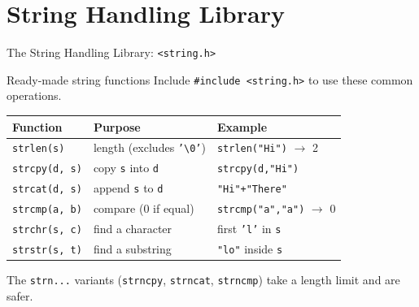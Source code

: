 \documentclass[aspectratio=169]{beamer}
\begin{document}
	\section{String Handling Library}
	\begin{frame}{The String Handling Library: \texttt{<string.h>}}
		\begin{block}{Ready-made string functions}
			Include \texttt{\#include <string.h>} to use these common operations.
		\end{block}
		\renewcommand{\arraystretch}{1.3}
		\centering
		\begin{tabular}{@{}llp{5.7cm}@{}}
			\toprule
			\textbf{Function} & \textbf{Purpose} & \textbf{Example} \\
			\midrule
			\texttt{strlen(s)}      & length (excludes \texttt{'\textbackslash 0'}) & \texttt{strlen("Hi")} $\rightarrow$ 2 \\
			\texttt{strcpy(d, s)}   & copy \texttt{s} into \texttt{d}   & \texttt{strcpy(d,"Hi")} \\
			\texttt{strcat(d, s)}   & append \texttt{s} to \texttt{d}   & \texttt{"Hi"+"There"} \\
			\texttt{strcmp(a, b)}   & compare (0 if equal)              & \texttt{strcmp("a","a")} $\rightarrow$ 0 \\
			\texttt{strchr(s, c)}   & find a character                  & first \texttt{'l'} in \texttt{s} \\
			\texttt{strstr(s, t)}   & find a substring                  & \texttt{"lo"} inside \texttt{s} \\
			\bottomrule
		\end{tabular}
		\vspace{0.15cm}
		\centering\footnotesize The \texttt{strn...} variants (\texttt{strncpy}, \texttt{strncat}, \texttt{strncmp}) take a length limit and are safer.
	\end{frame}
\end{document}
